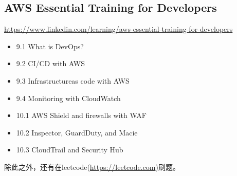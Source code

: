 \begin{myitems}
\end{myitems}\begin{mybox}
\section{AWS Essential Training for Developers}
\label{sec:orgdc8776e}
\tcblower{}
\url{https://www.linkedin.com/learning/aws-essential-training-for-developers}
\end{mybox}\begin{myitems}
\begin{itemize}
\item 9.1 What is DevOps?
\item 9.2 CI/CD with AWS
\item 9.3 Infrastructureas code with AWS
\item 9.4 Monitoring with CloudWatch
\item 10.1 AWS Shield and firewalls with WAF
\item 10.2 Inspector, GuardDuty, and Macie
\item 10.3 CloudTrail and Security Hub
\end{itemize}

\end{myitems}

除此之外，还有在leetcode(\url{https://leetcode.com})刷题。
